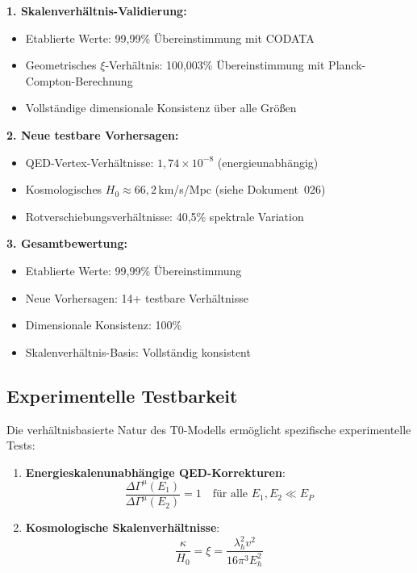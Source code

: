 	\begin{tcolorbox}[colback=green!5!white,colframe=green!75!black,title=Hauptergebnisse der T0-Verifikation]
		\textbf{1. Skalenverhältnis-Validierung:}
		\begin{itemize}
			\item Etablierte Werte: 99,99\% Übereinstimmung mit CODATA
			\item Geometrisches $\xi$-Verhältnis: 100,003\% Übereinstimmung mit Planck-Compton-Berechnung
			\item Vollständige dimensionale Konsistenz über alle Größen
		\end{itemize}
		
		\textbf{2. Neue testbare Vorhersagen:}
		\begin{itemize}
			\item QED-Vertex-Verhältnisse: $1,74 \times 10^{-8}$ (energieunabhängig)
			\item Kosmologisches $H_0 \approx 66{,}2\,$km/s/Mpc (siehe Dokument~026)
			\item Rotverschiebungsverhältnisse: 40,5\% spektrale Variation
		\end{itemize}
		
		\textbf{3. Gesamtbewertung:}
		\begin{itemize}
			\item Etablierte Werte: 99,99\% Übereinstimmung
			\item Neue Vorhersagen: 14+ testbare Verhältnisse
			\item Dimensionale Konsistenz: 100\%
			\item Skalenverhältnis-Basis: Vollständig konsistent
		\end{itemize}
	\end{tcolorbox}
	
	\subsection{Experimentelle Testbarkeit}
	
	Die verhältnisbasierte Natur des T0-Modells ermöglicht spezifische experimentelle Tests:
	
	\begin{enumerate}
		\item \textbf{Energieskalenunabhängige QED-Korrekturen}:
		\begin{equation}
			\frac{\Delta\Gamma^{\mu}(E_1)}{\Delta\Gamma^{\mu}(E_2)} = 1 \quad \text{für alle } E_1, E_2 \ll E_P
		\end{equation}
		
		\item \textbf{Kosmologische Skalenverhältnisse}:
		\begin{equation}
			\frac{\kappa}{H_0} = \xi = \frac{\lambda_h^2 v^2}{16\pi^3 E_h^2}
		\end{equation}
	\end{enumerate}
	
